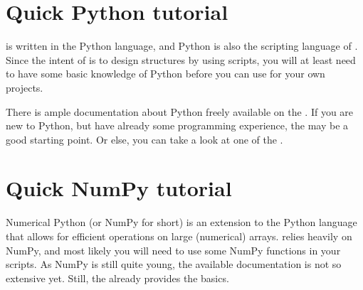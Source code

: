 \section{Quick {Python tutorial}}
\label{sec:python-tutorial}
\pyf is written in the Python language, and Python is also the scripting language of \pyf. Since the intent of \pyf is to design structures by using scripts, you will at least need to have some basic knowledge of Python before you can use \pyf for your own projects.

There is ample documentation about Python freely available on the . 
If you are new to Python, but have already some programming experience, the  may be a good starting point.
Or else, you can take a look at one of the .


\section{Quick NumPy tutorial}
\label{sec:numpy-tutorial}
Numerical Python (or NumPy for short) is an extension to the Python language that allows for efficient operations on large (numerical) arrays. \pyf relies heavily on NumPy, and most likely you will need to use some NumPy functions in your scripts. As NumPy is still quite young, the available documentation is not so extensive yet. Still, the  already provides the basics.


